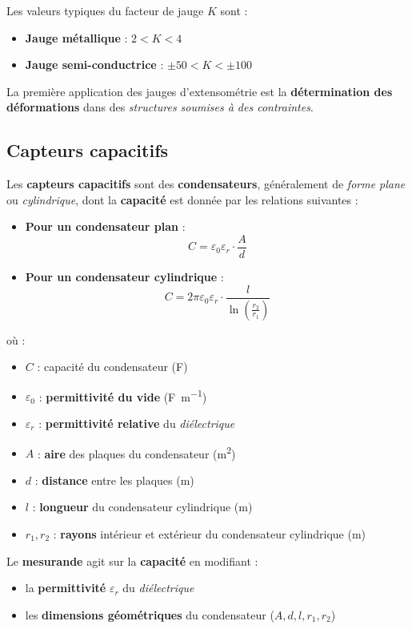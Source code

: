 Les valeurs typiques du facteur de jauge \( K \) sont :
\begin{itemize}
    \item \textbf{Jauge métallique} : \( 2 < K < 4 \)
    \item \textbf{Jauge semi-conductrice} : \( \pm 50 < K < \pm 100 \)
\end{itemize}

La première application des jauges d’extensométrie est la 
\textbf{détermination des déformations} dans des 
\textit{structures soumises à des contraintes}.

\subsection*{Capteurs capacitifs}

Les \textbf{capteurs capacitifs} sont des \textbf{condensateurs}, généralement 
de \textit{forme plane} ou \textit{cylindrique}, dont la \textbf{capacité} est 
donnée par les relations suivantes :

\begin{itemize}
    \item \textbf{Pour un condensateur plan} :
    \begin{equation}
        C = \varepsilon_0 \varepsilon_r \cdot \frac{A}{d}
    \end{equation}
    
    \item \textbf{Pour un condensateur cylindrique} :
    \begin{equation}
        C = 2 \pi \varepsilon_0 \varepsilon_r \cdot \frac{l}{\ln \left( \frac{r_2}{r_1} \right)}
    \end{equation}
\end{itemize}

où :
\begin{itemize}
    \item \( C \) : capacité du condensateur (\si{\farad})
    \item \( \varepsilon_0 \) : \textbf{permittivité du vide} (\si{\farad\per\meter})
    \item \( \varepsilon_r \) : \textbf{permittivité relative} du \textit{diélectrique}
    \item \( A \) : \textbf{aire} des plaques du condensateur (\si{\meter\squared})
    \item \( d \) : \textbf{distance} entre les plaques (\si{\meter})
    \item \( l \) : \textbf{longueur} du condensateur cylindrique (\si{\meter})
    \item \( r_1, r_2 \) : \textbf{rayons} intérieur et extérieur du condensateur cylindrique (\si{\meter})
\end{itemize}

Le \textbf{mesurande} agit sur la \textbf{capacité} en modifiant :
\begin{itemize}
    \item la \textbf{permittivité} \( \varepsilon_r \) du \textit{diélectrique}
    \item les \textbf{dimensions géométriques} du condensateur (\( A, d, l, r_1, r_2 \))
\end{itemize}
